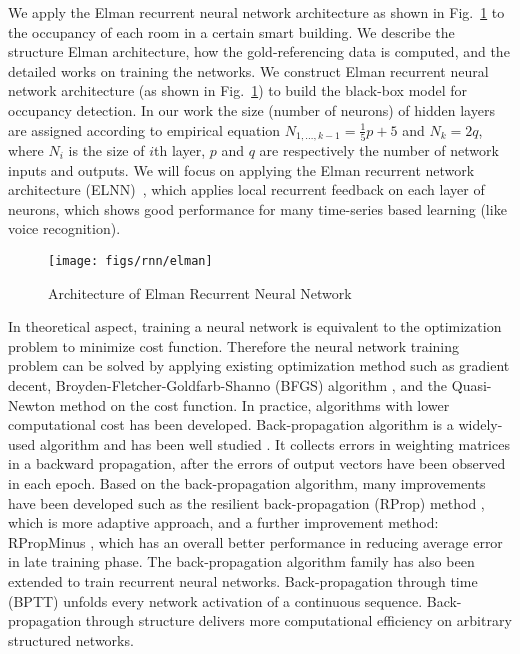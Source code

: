 We apply the Elman recurrent neural network architecture as shown in
Fig.~\ref{fig:elman} to the occupancy of each room in a certain smart building.
We describe the structure Elman architecture, how the gold-referencing data is
computed, and the detailed works on training the networks. We construct Elman recurrent neural network architecture (as shown in Fig.~\ref{fig:elman}) to build the black-box model for occupancy detection. In
our work the size (number of neurons) of hidden layers are assigned according
to empirical equation $N_{1,\ldots,k-1}=\frac15p+5$ and $N_k=2q$, where $N_i$
is the size of $i$th layer, $p$ and $q$ are respectively the number of network
inputs and outputs. We will focus on applying the Elman recurrent network
architecture (ELNN)~\cite{elman1990finding}, which applies local
recurrent feedback on each layer of neurons, which shows good
performance for many time-series based learning (like voice
recognition).

\begin{figure}[t]
    \centering
    \texttt{[image: figs/rnn/elman]}
    \caption{Architecture of Elman Recurrent Neural Network}
    \label{fig:elman}
\end{figure}


In theoretical aspect, training a neural network is equivalent to the optimization problem to minimize cost function. Therefore the neural network training problem can be solved by applying existing optimization method such as gradient decent, Broyden-Fletcher-Goldfarb-Shanno (BFGS) algorithm
\cite{heath2010sci}, and the Quasi-Newton method on the cost function. In practice, algorithms with lower computational cost has been developed. Back-propagation algorithm is a widely-used algorithm and has been well studied \cite{hecht1988backprop}. It collects errors in weighting matrices in a backward propagation, after the errors of output vectors have been observed in each epoch. Based on the back-propagation algorithm, many improvements have been developed such as the resilient back-propagation (RProp) method \cite{riedmiller1993direct}, which is more adaptive approach, and a further improvement method: RPropMinus \cite{igel2003empirical}, which has an overall better performance in reducing average error in late training phase. The back-propagation algorithm family has also been extended to train recurrent neural networks. Back-propagation through time (BPTT) \cite{werbos1990backprop} unfolds every network activation of a
continuous sequence. Back-propagation through structure delivers more computational efficiency on
arbitrary structured networks.
